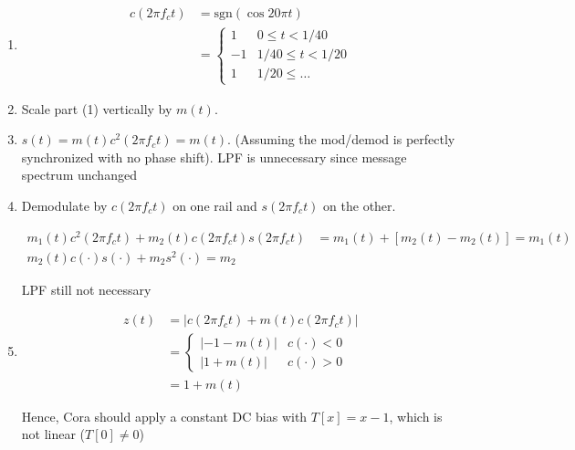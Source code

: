 \documentclass[12pt]{article}
\newcommand{\abs}[1]{\left\vert #1 \right\vert}
\begin{document}
\begin{enumerate}
    \item \begin{align*}
        c(2\pi f_c t) &= \text{sgn}(\cos 20 \pi t)\\ 
            &= \begin{cases}
                1 & 0 \leq t < 1/40\\ 
                -1 & 1/40 \leq t < 1/20\\ 
                1 & 1/20 \leq \dots
            \end{cases}
    \end{align*}
    \item Scale part (1) vertically by $m(t)$. 
    \item $s(t) = m(t) c^2(2\pi f_c t) = m(t)$. (Assuming the mod/demod is perfectly synchronized with no phase shift). LPF is unnecessary since message spectrum unchanged
    
    \item Demodulate by $c(2\pi f_c t)$ on one rail and $s(2\pi f_c t)$ on the other. 
    
    \begin{align*}
        m_1(t) c^2(2\pi f_c t) + m_2(t) c(2\pi f_c t) s(2\pi f_c t) &= m_1(t) + [m_2(t) - m_2(t)] = m_1(t)\\ 
        m_2(t) c(\cdot) s(\cdot) + m_2s^2(\cdot) = m_2
    \end{align*}

    LPF still not necessary
    
    \item \begin{align*}
        z(t) &= \abs{c(2\pi f_c t) + m(t) c(2\pi f_c t)}\\ 
        &= \begin{cases}
            \abs{-1 - m(t)} & c(\cdot) < 0\\ 
            \abs{1 + m(t) } & c(\cdot) > 0
        \end{cases}\\ 
        &= 1 + m(t)
    \end{align*}

    Hence, Cora should apply a constant DC bias with $T[x] = x - 1$, which is not linear ($T[0] \neq 0$) 
    
\end{enumerate}
\end{document}
